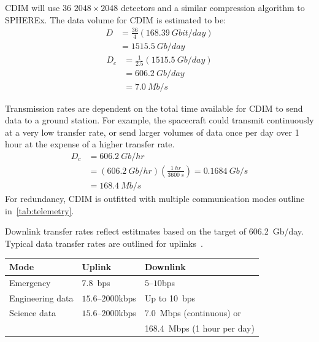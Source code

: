 \documentclass{ws-jai}
\begin{document}
CDIM will use 36 $2048\times2048$ detectors and a similar compression algorithm to SPHEREx.
The data volume for CDIM is estimated to be:
\begin{equation}\label{eq:telemetry-d}
  \begin{split}
    D &= \frac{36}{4} (\SI{168.39}{Gbit/day}) \\
    &= \SI{1515.5}{Gb/day}
  \end{split}
\end{equation}
\begin{equation} \label{eq:telemetry-dc}
  \begin{split}
    D_c &= \frac{1}{2.5}(\SI{1515.5}{Gb/day}) \\
    &= \SI{606.2}{Gb/day} \\
    &= \SI{7.0}{Mb/s}
  \end{split}
\end{equation}

Transmission rates are dependent on the total time available for CDIM to send data to a ground station.
For example, the spacecraft could transmit continuously at a very low transfer rate, or send larger volumes of data once per day over 1 hour at the expense of a higher transfer rate.
\begin{equation}\label{eq:telemetry-1hr}
  \begin{split}
    D_c &= \SI{606.2}{Gb/hr}  \\
     &= (\SI{606.2}{Gb/hr})(\frac{\SI{1}{hr}}{\SI{3600}{s}}) = \SI{0.1684}{Gb/s} \\
     &= \SI{168.4}{Mb/s}
  \end{split}
\end{equation}
For redundancy, CDIM is outfitted with multiple communication modes outline in~\autoref{tab:telemetry}.

\begin{wstable}[htb]
  \caption{Downlink transfer rates reflect estitmates based on the target of \SI{606.2}{Gb/day}.
  Typical data transfer rates are outlined for uplinks~\cite{smad2015}.
\label{tab:telemetry}}
  \begin{tabular}{@{}lll@{}} \toprule
    Mode & Uplink & Downlink \\ \midrule
    Emergency & \SI{7.8}{bps} & $5$--$10$\si{bps} \\
    Engineering data & $15.6$--$2000$\si{kbps} & Up to \SI{10}{bps} \\
    Science data & $15.6$--$2000$\si{kbps} & \SI{7.0}{Mbps} (continuous) or \\
    & & \SI{168.4}{Mbps} (1 hour per day)\\\bottomrule
  \end{tabular}
\end{wstable}
\end{document}
